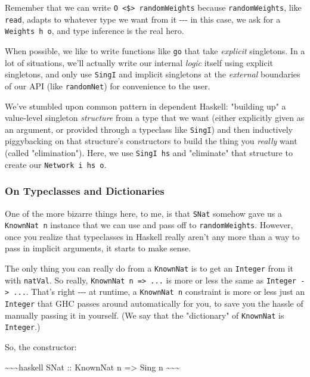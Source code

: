 \documentclass[]{article}
\begin{document}
Remember that we can write
\texttt{O\ \textless{}\$\textgreater{}\ randomWeights} because
\texttt{randomWeights}, like \texttt{read}, adapts to whatever type we want from
it -\/-\/- in this case, we ask for a \texttt{Weights\ h\ o}, and type inference
is the real hero.

When possible, we like to write functions like \texttt{go} that take
\emph{explicit} singletons. In a lot of situations, we'll actually write our
internal \emph{logic} itself using explicit singletons, and only use
\texttt{SingI} and implicit singletons at the \emph{external} boundaries of our
API (like \texttt{randomNet}) for convenience to the user.

We've stumbled upon common pattern in dependent Haskell: "building up" a
value-level singleton \emph{structure} from a type that we want (either
explicitly given as an argument, or provided through a typeclass like
\texttt{SingI}) and then inductively piggybacking on that structure's
constructors to build the thing you \emph{really} want (called "elimination").
Here, we use \texttt{SingI\ hs} and "eliminate" that structure to create our
\texttt{Network\ i\ hs\ o}.

\subsubsection{On Typeclasses and Dictionaries}

One of the more bizarre things here, to me, is that \texttt{SNat} somehow gave
us a \texttt{KnownNat\ n} instance that we can use and pass off to
\texttt{randomWeights}. However, once you realize that typeclasses in Haskell
really aren't any more than a way to pass in implicit arguments, it starts to
make sense.

The only thing you can really do from a \texttt{KnownNat} is to get an
\texttt{Integer} from it with \texttt{natVal}. So really,
\texttt{KnownNat\ n\ =\textgreater{}\ ...} is more or less the same as
\texttt{Integer\ -\textgreater{}\ ...}. That's right -\/-\/- at runtime, a
\texttt{KnownNat\ n} constraint is more or less just an \texttt{Integer} that
GHC passes around automatically for you, to save you the hassle of manually
passing it in yourself. (We say that the "dictionary" of \texttt{KnownNat} is
\texttt{Integer}.)

So, the constructor:

\textasciitilde{}\textasciitilde{}\textasciitilde{}haskell SNat :: KnownNat n
=\textgreater{} Sing n \textasciitilde{}\textasciitilde{}\textasciitilde{}
\end{document}
